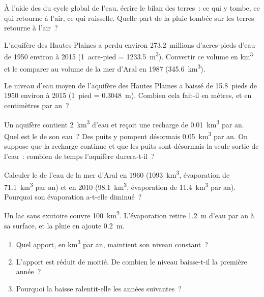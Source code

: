 \begin{exercise}[$\star\star$]\label{exo:g10:freshwater-resources:8}
À l'aide des  du cycle global de l'eau, écrire le bilan des terres~: ce
qui y tombe, ce qui retourne à l'air, ce qui ruisselle. Quelle part de la
pluie tombée sur les terres retourne à l'air~?
\end{exercise}

\begin{exercise}[$\star\star$]\label{exo:g10:freshwater-resources:9}
L'aquifère des Hautes Plaines a perdu environ \num{273.2}~millions
d'acres-pieds d'eau de 1950 environ à 2015 (\num{1}~acre-pied =
\qty{1233.5}{m^3}). Convertir ce volume en \unit{km^3} et le comparer au
volume de la mer d'Aral en 1987 (\qty{345.6}{km^3}).
\end{exercise}

\begin{exercise}[$\star\star$]\label{exo:g10:freshwater-resources:10}
Le niveau d'eau moyen de l'aquifère des Hautes Plaines a baissé de
\num{15.8}~pieds de 1950 environ à 2015 (\num{1}~pied = \qty{0.3048}{m}).
Combien cela fait-il en mètres, et en centimètres par an~?
\end{exercise}

\begin{exercise}[$\star\star$]\label{exo:g10:freshwater-resources:11}
Un aquifère contient \qty{2}{km^3} d'eau et reçoit une recharge de
\qty{0.01}{km^3} par an. Quel est le  de son eau~? Des
puits y pompent désormais \qty{0.05}{km^3} par an. On suppose que la
recharge continue et que les puits sont désormais la seule sortie de
l'eau~: combien de temps l'aquifère durera-t-il~?
\end{exercise}

\begin{exercise}[$\star\star\star$]\label{exo:g10:freshwater-resources:12}
Calculer le  de l'eau de la mer d'Aral en 1960
(\qty{1093}{km^3}, évaporation de \qty{71.1}{km^3} par an) et en 2010
(\qty{98.1}{km^3}, évaporation de \qty{11.4}{km^3} par an). Pourquoi son
évaporation a-t-elle diminué~?
\end{exercise}

\begin{exercise}[$\star\star\star$]\label{exo:g10:freshwater-resources:13}
Un lac sans exutoire couvre \qty{100}{km^2}. L'évaporation retire
\qty{1.2}{m} d'eau par an à sa surface, et la pluie en ajoute \qty{0.2}{m}.
\begin{enumerate}
  \item Quel apport, en \unit{km^3} par an, maintient son niveau
        constant~?
  \item L'apport est réduit de moitié. De combien le niveau baisse-t-il la
        première année~?
  \item Pourquoi la baisse ralentit-elle les années suivantes~?
\end{enumerate}
\end{exercise}

